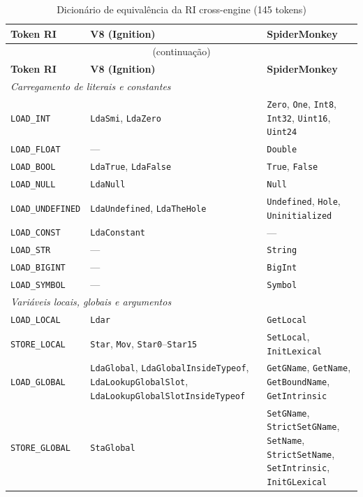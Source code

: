 {\footnotesize
\begin{longtable}{@{}p{4.2cm}p{5.3cm}p{5.3cm}@{}}
\caption{Dicionário de equivalência da RI cross-engine (145 tokens)}
\label{tab:ap-ir-dict}\\
\toprule
\textbf{Token RI} & \textbf{V8 (Ignition)} & \textbf{SpiderMonkey} \\
\midrule
\endfirsthead
\multicolumn{3}{c}{\footnotesize(continuação)} \\
\toprule
\textbf{Token RI} & \textbf{V8 (Ignition)} & \textbf{SpiderMonkey} \\
\midrule
\endhead
\midrule
\multicolumn{3}{l}{\textit{Carregamento de literais e constantes}} \\
\midrule
\texttt{LOAD\_INT} & \texttt{LdaSmi}, \texttt{LdaZero} & \texttt{Zero}, \texttt{One}, \texttt{Int8}, \texttt{Int32}, \texttt{Uint16}, \texttt{Uint24} \\
\texttt{LOAD\_FLOAT} & --- & \texttt{Double} \\
\texttt{LOAD\_BOOL} & \texttt{LdaTrue}, \texttt{LdaFalse} & \texttt{True}, \texttt{False} \\
\texttt{LOAD\_NULL} & \texttt{LdaNull} & \texttt{Null} \\
\texttt{LOAD\_UNDEFINED} & \texttt{LdaUndefined}, \texttt{LdaTheHole} & \texttt{Undefined}, \texttt{Hole}, \texttt{Uninitialized} \\
\texttt{LOAD\_CONST} & \texttt{LdaConstant} & --- \\
\texttt{LOAD\_STR} & --- & \texttt{String} \\
\texttt{LOAD\_BIGINT} & --- & \texttt{BigInt} \\
\texttt{LOAD\_SYMBOL} & --- & \texttt{Symbol} \\
\midrule
\multicolumn{3}{l}{\textit{Variáveis locais, globais e argumentos}} \\
\midrule
\texttt{LOAD\_LOCAL} & \texttt{Ldar} & \texttt{GetLocal} \\
\texttt{STORE\_LOCAL} & \texttt{Star}, \texttt{Mov}, \texttt{Star0}--\texttt{Star15} & \texttt{SetLocal}, \texttt{InitLexical} \\
\texttt{LOAD\_GLOBAL} & \texttt{LdaGlobal}, \texttt{LdaGlobalInsideTypeof}, \texttt{LdaLookupGlobalSlot}, \texttt{LdaLookupGlobalSlotInsideTypeof} & \texttt{GetGName}, \texttt{GetName}, \texttt{GetBoundName}, \texttt{GetIntrinsic} \\
\texttt{STORE\_GLOBAL} & \texttt{StaGlobal} & \texttt{SetGName}, \texttt{StrictSetGName}, \texttt{SetName}, \texttt{StrictSetName}, \texttt{SetIntrinsic}, \texttt{InitGLexical} \\

\end{longtable}}
